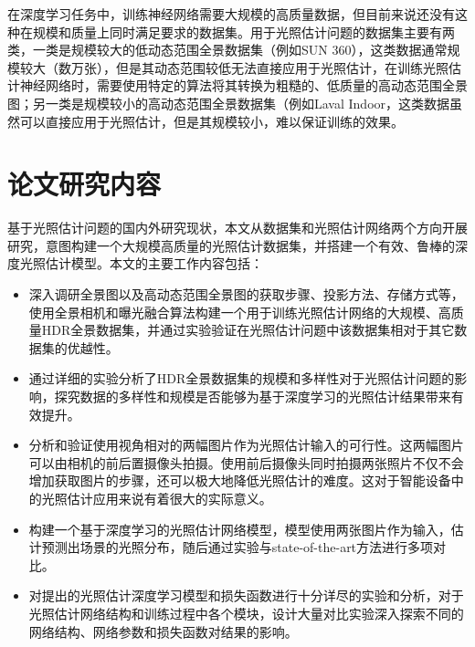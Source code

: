 在深度学习任务中，训练神经网络需要大规模的高质量数据，但目前来说还没有这种在规模和质量上同时满足要求的数据集。用于光照估计问题的数据集主要有两类，一类是规模较大的低动态范围全景数据集（例如SUN 360\cite{xiao2012recognizing}），这类数据通常规模较大（数万张），但是其动态范围较低无法直接应用于光照估计，在训练光照估计神经网络时，需要使用特定的算法将其转换为粗糙的、低质量的高动态范围全景图；另一类是规模较小的高动态范围全景数据集（例如Laval Indoor\cite{gardner2017learning}，这类数据虽然可以直接应用于光照估计，但是其规模较小，难以保证训练的效果。

\section{论文研究内容}
基于光照估计问题的国内外研究现状，本文从数据集和光照估计网络两个方向开展研究，意图构建一个大规模高质量的光照估计数据集，并搭建一个有效、鲁棒的深度光照估计模型。本文的主要工作内容包括：
\begin{itemize}
    \item 深入调研全景图以及高动态范围全景图的获取步骤、投影方法、存储方式等，使用全景相机和曝光融合算法构建一个用于训练光照估计网络的大规模、高质量HDR全景数据集，并通过实验验证在光照估计问题中该数据集相对于其它数据集的优越性。
    \item 通过详细的实验分析了HDR全景数据集的规模和多样性对于光照估计问题的影响，探究数据的多样性和规模是否能够为基于深度学习的光照估计结果带来有效提升。
    \item 分析和验证使用视角相对的两幅图片作为光照估计输入的可行性。这两幅图片可以由相机的前后置摄像头拍摄。使用前后摄像头同时拍摄两张照片不仅不会增加获取图片的步骤，还可以极大地降低光照估计的难度。这对于智能设备中的光照估计应用来说有着很大的实际意义。
    \item 构建一个基于深度学习的光照估计网络模型，模型使用两张图片作为输入，估计预测出场景的光照分布，随后通过实验与state-of-the-art方法进行多项对比。
    \item 对提出的光照估计深度学习模型和损失函数进行十分详尽的实验和分析，对于光照估计网络结构和训练过程中各个模块，设计大量对比实验深入探索不同的网络结构、网络参数和损失函数对结果的影响。
\end{itemize}